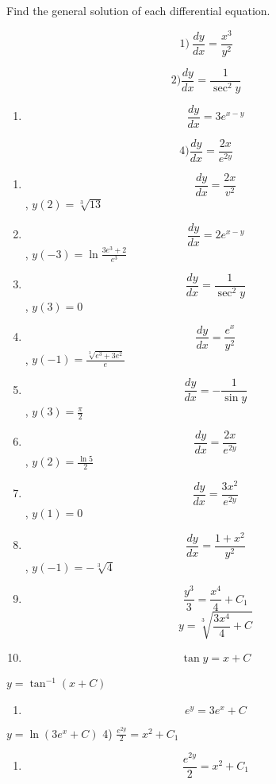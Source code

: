 \documentclass[
]{article}
\author{}
\date{}
\providecommand{\tightlist}{%
  \setlength{\itemsep}{0pt}\setlength{\parskip}{0pt}}
\begin{document}
Find the general solution of each differential equation.

\[1) \ \frac{dy}{dx} = \frac{x^3}{y^2}\]

\[2) \frac{dy}{dx} = \frac{1}{\sec^2 y}\]

\begin{enumerate}
\def\labelenumi{\arabic{enumi})}
\setcounter{enumi}{2}
\tightlist
\item
  \[\frac{dy}{dx} = 3e^{x-y}\]
\end{enumerate}

\[4) \frac{dy}{dx} = \frac{2x}{e^{2y}}\]

\begin{enumerate}
\def\labelenumi{\arabic{enumi})}
\setcounter{enumi}{4}
\item
  \[\frac{dy}{dx} = \frac{2x}{v^2}\] , \(y(2) = \sqrt[3]{13}\)
\item
  \[\frac{dy}{dx} = 2e^{x-y}\] , \(y(-3) = \ln \frac{3e^3 + 2}{e^3}\)
\item
  \[\frac{dy}{dx} = \frac{1}{\sec^2 y}\] , \(y(3) = 0\)
\item
  \[\frac{dy}{dx} = \frac{e^x}{y^2}\] ,
  \(y(-1) = \frac{\sqrt[3]{e^3 + 3e^2}}{e}\)
\item
  \[\frac{dy}{dx} = -\frac{1}{\sin y}\] , \(y(3) = \frac{\pi}{2}\)
\item
  \[\frac{dy}{dx} = \frac{2x}{e^{2y}}\] , \(y(2) = \frac{\ln 5}{2}\)
\item
  \[\frac{dy}{dx} = \frac{3x^2}{e^{2y}}\] , \(y(1) = 0\)
\item
  \[\frac{dy}{dx} = \frac{1+x^2}{y^2}\] , \(y(-1) = -\sqrt[3]{4}\)
\item
  \[\frac{y^3}{3} = \frac{x^4}{4} + C_1\]
  \[y = \sqrt[3]{\frac{3x^4}{4} + C}\]
\item
  \[\tan y = x + C\]
\end{enumerate}

\(y = \tan^{-1} (x + C)\)

\begin{enumerate}
\def\labelenumi{\arabic{enumi})}
\setcounter{enumi}{2}
\tightlist
\item
  \[e^y = 3e^x + C\]
\end{enumerate}

\(y = \ln (3e^x + C)\) 4) \(\frac{e^{2y}}{2} = x^2 + C_1\)

\begin{enumerate}
\def\labelenumi{\arabic{enumi})}
\setcounter{enumi}{3}
\tightlist
\item
  \[\frac{e^{2y}}{2} = x^2 + C_1\]
\end{enumerate}
\end{document}

